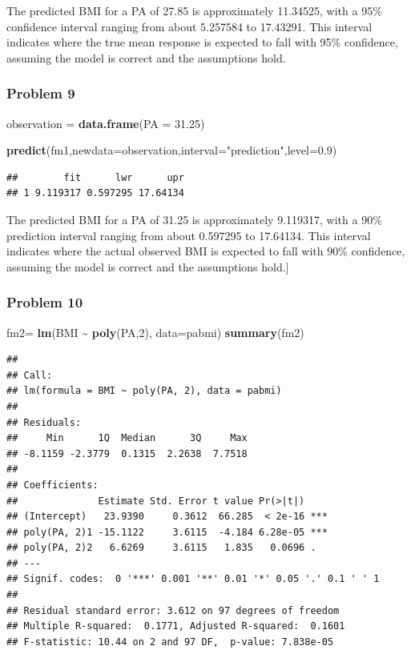\documentclass[
]{article}
\newenvironment{Shaded}{\begin{snugshade}}{\end{snugshade}}
\newcommand{\AttributeTok}[1]{\textcolor[rgb]{0.13,0.29,0.53}{#1}}
\newcommand{\DecValTok}[1]{\textcolor[rgb]{0.00,0.00,0.81}{#1}}
\newcommand{\FloatTok}[1]{\textcolor[rgb]{0.00,0.00,0.81}{#1}}
\newcommand{\FunctionTok}[1]{\textcolor[rgb]{0.13,0.29,0.53}{\textbf{#1}}}
\newcommand{\NormalTok}[1]{#1}
\newcommand{\OtherTok}[1]{\textcolor[rgb]{0.56,0.35,0.01}{#1}}
\newcommand{\SpecialCharTok}[1]{\textcolor[rgb]{0.81,0.36,0.00}{\textbf{#1}}}
\newcommand{\StringTok}[1]{\textcolor[rgb]{0.31,0.60,0.02}{#1}}
\begin{document}
The predicted BMI for a PA of 27.85 is approximately 11.34525, with a
95\% confidence interval ranging from about 5.257584 to 17.43291. This
interval indicates where the true mean response is expected to fall with
95\% confidence, assuming the model is correct and the assumptions hold.

\hypertarget{problem-9}{%
\subsubsection{Problem 9}\label{problem-9}}

\begin{Shaded}
\begin{Highlighting}[]
\NormalTok{observation }\OtherTok{=} \FunctionTok{data.frame}\NormalTok{(}\AttributeTok{PA =} \FloatTok{31.25}\NormalTok{)}

\FunctionTok{predict}\NormalTok{(fm1,}\AttributeTok{newdata=}\NormalTok{observation,}\AttributeTok{interval=}\StringTok{"prediction"}\NormalTok{,}\AttributeTok{level=}\FloatTok{0.9}\NormalTok{)}
\end{Highlighting}
\end{Shaded}

\begin{verbatim}
##        fit      lwr      upr
## 1 9.119317 0.597295 17.64134
\end{verbatim}

The predicted BMI for a PA of 31.25 is approximately 9.119317, with a
90\% prediction interval ranging from about 0.597295 to 17.64134. This
interval indicates where the actual observed BMI is expected to fall
with 90\% confidence, assuming the model is correct and the assumptions
hold.{]}

\hypertarget{problem-10}{%
\subsubsection{Problem 10}\label{problem-10}}

\begin{Shaded}
\begin{Highlighting}[]
\NormalTok{fm2}\OtherTok{=} \FunctionTok{lm}\NormalTok{(BMI }\SpecialCharTok{\textasciitilde{}} \FunctionTok{poly}\NormalTok{(PA,}\DecValTok{2}\NormalTok{), }\AttributeTok{data=}\NormalTok{pabmi)}
\FunctionTok{summary}\NormalTok{(fm2)}
\end{Highlighting}
\end{Shaded}

\begin{verbatim}
## 
## Call:
## lm(formula = BMI ~ poly(PA, 2), data = pabmi)
## 
## Residuals:
##     Min      1Q  Median      3Q     Max 
## -8.1159 -2.3779  0.1315  2.2638  7.7518 
## 
## Coefficients:
##              Estimate Std. Error t value Pr(>|t|)    
## (Intercept)   23.9390     0.3612  66.285  < 2e-16 ***
## poly(PA, 2)1 -15.1122     3.6115  -4.184 6.28e-05 ***
## poly(PA, 2)2   6.6269     3.6115   1.835   0.0696 .  
## ---
## Signif. codes:  0 '***' 0.001 '**' 0.01 '*' 0.05 '.' 0.1 ' ' 1
## 
## Residual standard error: 3.612 on 97 degrees of freedom
## Multiple R-squared:  0.1771, Adjusted R-squared:  0.1601 
## F-statistic: 10.44 on 2 and 97 DF,  p-value: 7.838e-05
\end{verbatim}
\end{document}
